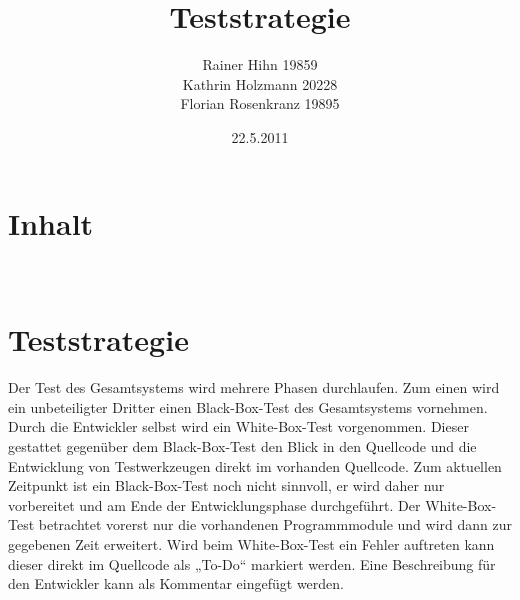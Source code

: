 \documentclass[a4paper,15pt]{article}
\title{Teststrategie}
\author{Rainer Hihn 19859\\Kathrin Holzmann 20228\\Florian Rosenkranz 19895}
\date{22.5.2011}
\begin{document}
\sffamily
\maketitle
\newpage


\section*{Inhalt}

\tableofcontents

\newpage
\
\section{Teststrategie}

Der Test des Gesamtsystems wird mehrere Phasen durchlaufen.
Zum einen wird ein unbeteiligter Dritter einen Black-Box-Test des Gesamtsystems vornehmen. Durch die Entwickler selbst wird ein White-Box-Test vorgenommen.
\newline
\newline
Dieser gestattet gegenüber dem Black-Box-Test den Blick in den Quellcode und die Entwicklung von
Testwerkzeugen direkt im vorhanden Quellcode.
\newline
\newline
Zum aktuellen Zeitpunkt ist ein Black-Box-Test noch nicht sinnvoll, er wird daher nur vorbereitet und
am Ende der Entwicklungsphase durchgeführt. Der White-Box-Test betrachtet vorerst nur die
vorhandenen Programmmodule und wird dann zur gegebenen Zeit erweitert.
Wird beim White-Box-Test ein Fehler auftreten kann dieser direkt im Quellcode als „To-Do“ markiert
werden. Eine Beschreibung für den Entwickler kann als Kommentar eingefügt werden.
\end{document}
